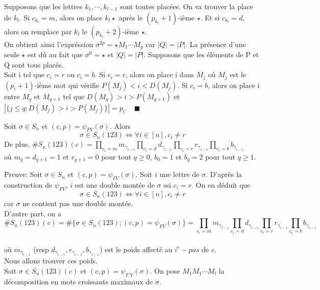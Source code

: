 Supposons que les lettres $k_{1},\cdots, k_{l-1} $ sont toutes placées. On va trouver la place de $k_{l}$.
Si $c_{k_{l}} = m$, alors on place $k_{l}\star$ après le $(p_{k_{l}}+1)$-ième $\star$. Et si $c_{k_{l}}=d$, alors on
remplace par $k_{l}$ le $(p_{k_{l}}+2)$-ième $\star$.\\
On obtient ainsi l'expréssion $\sigma^{2p} = \star M_{1}\cdots M_{p} $ car $|Q| = |P|$. La présence d'une seule $\star$
est dû au fait que $\sigma^0 = \star$ et $|Q| = |P|$. Supposons que les éléments de P et Q sont tous placés.\\ Soit i
tel que $c_{i}=r \text{ ou } c_{i}=b$. Si $c_{i}=r$, alors on place i dans $M_{j}$ où $M_{j}$ est le $(p_{i}+1)$-ième
mot qui vérifie $P(M_{j}) < i < D(M_{j})$.
Si $c_{i}=b$, alors on place i entre $M_{q}$ et $M_{q+1}$ tel que $D(M_{q})>i>P(M_{q+1}) $ et $|\{j\leq q;
	D(M_{j})>i>P(M_{j})\}| = p_{i} $. $\text{ } \blacksquare$\\
\begin{lemme}\label{noRedPath123}
	Soit $\sigma \in S_{n}$ et $(c, p) = \psi_{FV}(\sigma)$. Alors $$ \sigma \in S_{n}(123) \iff \forall i \in [n], c_{i}\neq r$$
	De plus, $\#S_{n}(123)(c) = \prod\limits_{c_{i}=m}m_{\gamma_{i-1}} \prod\limits_{c_{i}=d}d_{\gamma_{i-1}} \prod\limits_{c_{i}=r}r_{\gamma_{i-1}} \prod\limits_{c_{i}=b}b_{\gamma_{i-1}}$\\
	où $m_{q}=d_{q+1}=1$ et $r_{q+1}=0$ pour tout $q\geq 0$, $b_{0}=1$ et $b_{q}=2$ pour tout $q\geq 1$.
\end{lemme}
Preuve: Soit $\sigma \in S_{n}$ et $(c,p) = \psi_{FV}(\sigma)$. Soit $i$ une lettre de $\sigma$. D'après la construction de $\psi_{FV}$, $i$ est une double montée de $\sigma$ ssi $c_{i}=r$. On en déduit que $$\sigma \in S_{n}(123) \iff \forall i \in [n], c_{i}\neq r$$ car $\sigma$ ne contient pas une double montée.\vspace{10pt}\\
D'autre part, on a $$\#S_{n}(123)(c) = \#\{\sigma \in S_{n}(123); (c, p)=\psi_{FV}(\sigma)\}= \prod\limits_{c_{i}=m}m_{\gamma_{i-1}} \prod\limits_{c_{i}=d}d_{\gamma_{i-1}} \prod\limits_{c_{i}=r}r_{\gamma_{i-1}} \prod\limits_{c_{i}=b}b_{\gamma_{i-1}}$$\\
où $m_{\gamma_{i-1}}$ (resp $d_{\gamma_{i-1}}, r_{\gamma_{i-1}}, b_{\gamma_{i-1}}$) est le poids affecté au $i^{e}-pas $ de $c$.\vspace{5pt}\\
Nous allons trouver ces poids.\\
Soit $\sigma \in S_{n}(123)(c)$ et $(c, p)=\psi_{F.V}(\sigma)$. On pose $M_{1}M_{1} \cdots M_{l}$ la décomposition en mots croissants maximaux de $\sigma$.\vspace{5pt}\\
